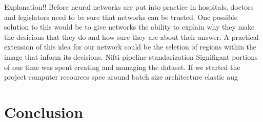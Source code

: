 \documentclass[12pt]{article}
\begin{document}
Explanation!!
Before neural networks are put into practice in hospitals, doctors and legislators need to be sure that networks can be trusted.
One possible solution to this would be to give networks the ability to explain why they make the desicions that they do and how sure they are about their answer.
A practical extension of this idea for our network could be the seletion of regions within the image that inform its decisions.
Nifti pipeline standarization
Signifigant portions of our time was spent creating and managing the dataset.
If we started the project
computer recources
spec around batch size
architecture
elastic aug
\section{Conclusion}



\end{document}
